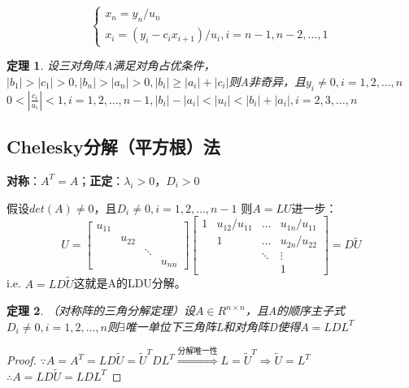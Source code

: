\documentclass[a4paper]{article}
\newtheorem{theorem}{定理}[section]
\begin{document}
\begin{equation}
  \left\{
    \begin{array}{lr}
      x_n = y_n/u_n \\
      x_i = (y_i-c_ix_{i+1})/u_i, i=n-1,n-2,\dots, 1
    \end{array}
    \right.
    \label{eq:4.10}
\end{equation}

\begin{theorem}
  设三对角阵A满足对角占优条件，$|b_1|>|c_1|>0, |b_n|>|a_n|>0, |b_i|\ge |a_i|+|c_i|$则A非奇异，且$y_i\neq 0, i=1,2,\dots, n$
  $0<|\frac{c_i}{u_i}|<1, i=1,2,\dots, n-1, |b_i|-|a_i|<|u_i|<|b_i|+|a_i|, i=2,3,\dots, n$
\end{theorem}

\subsection{Chelesky分解（平方根）法}
\textbf{对称}：$A^T = A$；\textbf{正定}：$\lambda_i > 0$，$D_i > 0$

假设$det(A)\neq 0$，且$D_i\neq 0, i=1,2,\dots, n-1$
则$A=LU$进一步：
$$U=\left[
  \begin{matrix}
    u_{11} \\
    & u_{22} \\
    & & \ddots \\
    & & & u_{nn}
  \end{matrix}\right]
  \left[
    \begin{matrix}
      1 & u_{12}/u_{11} & \dots & u_{1n}/u_{11} \\
      & 1 & \dots & u_{2n}/u_{22} \\
      & & \ddots & \vdots \\
      & & & 1
    \end{matrix}
    \right]=D\widetilde{U}
  $$
i.e. $A=LD\widetilde{U}$这就是A的LDU分解。

\begin{theorem}
  （对称阵的三角分解定理）设$A\in R^{n\times n}$，且A的顺序主子式$D_i\neq 0, i=1,2,\dots,n$则$\exists$唯一单位下三角阵L和对角阵D使得$A=LDL^T$
\end{theorem}

\begin{proof}
$\because A=A^T=LD\widetilde{U} = \widetilde{U}^TDL^T \stackrel{\text{分解唯一性}}{\Rightarrow} L=\widetilde{U}^T\Rightarrow \widetilde{U}=L^T$ \\
$\therefore A=LD\widetilde{U}=LDL^T$
\end{proof}
\end{document}

